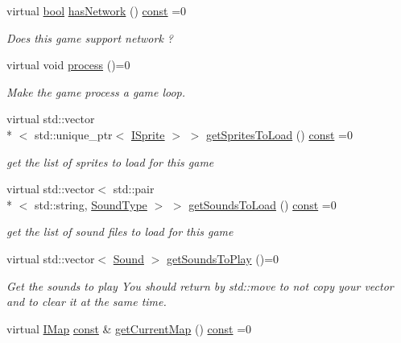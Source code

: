 \begin{DoxyCompactItemize}
virtual \hyperlink{term__entry_8h_a002004ba5d663f149f6c38064926abac}{bool} \hyperlink{classarcade_1_1_i_game_ae66bf253e252f43ce17d9e94f08a1d1c}{has\-Network} () \hyperlink{term__entry_8h_a57bd63ce7f9a353488880e3de6692d5a}{const} =0
\begin{DoxyCompactList}\small\item\em Does this game support network ? \end{DoxyCompactList}\item 
virtual void \hyperlink{classarcade_1_1_i_game_af0111a41083f38a1af1a7f94287e6e77}{process} ()=0
\begin{DoxyCompactList}\small\item\em Make the game process a game loop. \end{DoxyCompactList}\item 
virtual std\-::vector\\*
$<$ std\-::unique\-\_\-ptr$<$ \hyperlink{classarcade_1_1_i_sprite}{I\-Sprite} $>$ $>$ \hyperlink{classarcade_1_1_i_game_a2d0dc7c78a68c4dd0359911775993f68}{get\-Sprites\-To\-Load} () \hyperlink{term__entry_8h_a57bd63ce7f9a353488880e3de6692d5a}{const} =0
\begin{DoxyCompactList}\small\item\em get the list of sprites to load for this game \end{DoxyCompactList}\item 
virtual std\-::vector$<$ std\-::pair\\*
$<$ std\-::string, \hyperlink{namespacearcade_a3bb4743a2eea59f3927e404e6549cae5}{Sound\-Type} $>$ $>$ \hyperlink{classarcade_1_1_i_game_a0b66cd9ef3b5cd0dff95debb7e4f594e}{get\-Sounds\-To\-Load} () \hyperlink{term__entry_8h_a57bd63ce7f9a353488880e3de6692d5a}{const} =0
\begin{DoxyCompactList}\small\item\em get the list of sound files to load for this game \end{DoxyCompactList}\item 
virtual std\-::vector$<$ \hyperlink{structarcade_1_1_sound}{Sound} $>$ \hyperlink{classarcade_1_1_i_game_a88b3c7efb13780cdbbdf5b879a18ed4d}{get\-Sounds\-To\-Play} ()=0
\begin{DoxyCompactList}\small\item\em Get the sounds to play You should return by std\-::move to not copy your vector and to clear it at the same time. \end{DoxyCompactList}\item 
virtual \hyperlink{classarcade_1_1_i_map}{I\-Map} \hyperlink{term__entry_8h_a57bd63ce7f9a353488880e3de6692d5a}{const} \& \hyperlink{classarcade_1_1_i_game_ac3906ee9bb340b92ddc3ef2a9c61a6cc}{get\-Current\-Map} () \hyperlink{term__entry_8h_a57bd63ce7f9a353488880e3de6692d5a}{const} =0

\end{DoxyCompactItemize}
